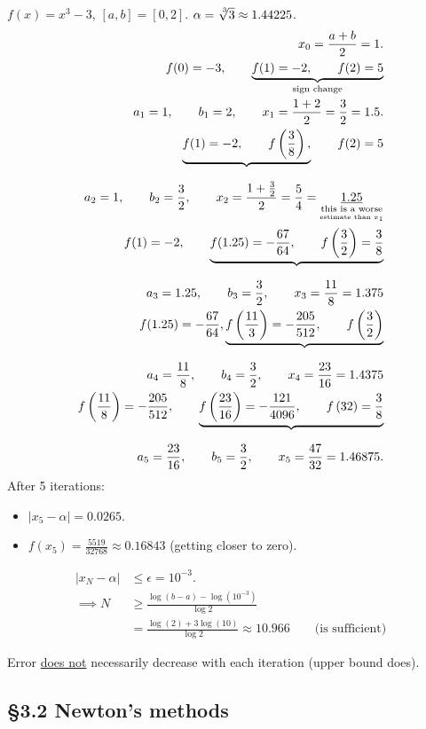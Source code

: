 \documentclass[]{article}
\begin{document}
\begin{example}
	$f(x)=x^3-3$, $[a,b]=[0,2]$.
	$\alpha = \nrt33 \approx 1.44225$.
	\begin{align*}
		x_0 = \frac{a+b}2 = 1. \\
		f(0) = -3, \qquad \ub{\text{sign change}}{f(1)=-2, \qquad f(2)=5}  \\
		a_1 = 1, \qquad b_1 = 2, \qquad x_1 = \frac{1+2}2 = \frac32 = 1.5. \\
		\ub{\,}{f(1) = -2, \qquad f\plr{\frac38},} \qquad f(2)=5 \\
		a_2 = 1, \qquad b_2=\frac32, \qquad x_2 = \frac{1+\frac32}2 = \frac54 = \us{\us{\text{estimate than }x_1}{\text{this is a worse}}}{\ul{1.25}} \\
		f(1) = -2, \qquad \ub{\,}{f(1.25) = - \frac{67}{64}, \qquad f\plr{\frac32} = \frac38} \\
		a_3 = 1.25, \qquad b_3 = \frac32, \qquad x_3 = \frac{11}8 = 1.375 \\
		f(1.25) = -\frac{67}{64}, \ub{\,}{f\plr{\frac{11}3} = -\frac{205}{512}, \qquad f\plr{\frac32}} \\
		a_4 = \frac{11}8, \qquad b_4 = \frac32, \qquad x_4 = \frac{23}{16} = 1.4375 \\
		f\plr{\frac{11}8} = -\frac{205}{512}, \qquad \ub{\,}{f\plr{\frac{23}{16}} = -\frac{121}{4096}, \qquad f\plr{32} = \frac38} \\
		a_5 = \frac{23}{16}, \qquad b_5 = \frac32, \qquad x_5 = \frac{47}{32} = 1.46875.
	\end{align*}
	After 5 iterations:
	\begin{itemize}
		\item $|x_5-\alpha| = 0.0265$.
		\item $f(x_5) = \frac{5519}{32768} \approx 0.16843$ (getting closer to zero).
	\end{itemize}
	\begin{align*}
		|x_N - \alpha| &\leq \epsilon = 10^{-3}. \\
		\implies N &\geq \frac{\log(b-a)-\log(10^{-3})}{\log2} \\
					&= \frac{\log(2) + 3\log(10)}{\log 2}
					\approx 10.966 \qquad \text{(is sufficient)}
	\end{align*}
\end{example}
\begin{note}
	Error \ul{does not} necessarily decrease with each iteration (upper bound does).
\end{note}

\subsection*{\S3.2 Newton's methods}
\end{document}

